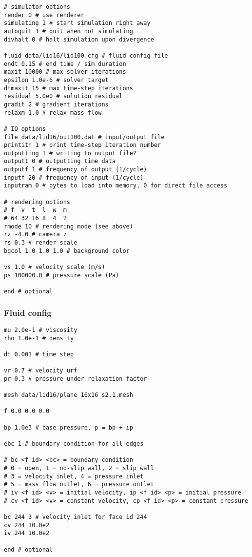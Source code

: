 \documentclass[12pt]{article}
\begin{document}
\begin{verbatim}
# simulator options
render 0 # use renderer
simulating 1 # start simulation right away
autoquit 1 # quit when not simulating
divhalt 0 # halt simulation upon divergence

fluid data/lid16/lid100.cfg # fluid config file
endt 0.15 # end time / sim duration
maxit 10000 # max solver iterations
epsilon 1.0e-6 # solver target
dtmaxit 15 # max time-step iterations
residual 5.0e0 # solution residual
gradit 2 # gradient iterations
relaxm 1.0 # relax mass flow

# IO options
file data/lid16/out100.dat # input/output file
printitn 1 # print time-step iteration number
outputting 1 # writing to output file?
outputt 0 # outputting time data
outputf 1 # frequency of output (1/cycle)
inputf 20 # frequency of input (1/cycle)
inputram 0 # bytes to load into memory, 0 for direct file access

# rendering options
# f  v  t  l  w  m
# 64 32 16 8  4  2
rmode 10 # rendering mode (see above)
rz -4.0 # camera z
rs 0.3 # render scale
bgcol 1.0 1.0 1.0 # background color

vs 1.0 # velocity scale (m/s)
ps 100000.0 # pressure scale (Pa)

end # optional
\end{verbatim}

\subsubsection{Fluid config}

\begin{verbatim}
mu 2.0e-1 # viscosity
rho 1.0e-1 # density

dt 0.001 # time step

vr 0.7 # velocity urf
pr 0.3 # pressure under-relaxation factor

mesh data/lid16/plane_16x16_s2.1.mesh

f 0.0 0.0 0.0

bp 1.0e3 # base pressure, p = bp + ip

ebc 1 # boundary condition for all edges

# bc <f id> <bc> = boundary condition
# 0 = open, 1 = no-slip wall, 2 = slip wall
# 3 = velocity inlet, 4 = pressure inlet
# 5 = mass flow outlet, 6 = pressure outlet
# iv <f id> <v> = initial velocity, ip <f id> <p> = initial pressure
# cv <f id> <v> = constant velocity, cp <f id> <p> = constant pressure

bc 244 3 # velocity inlet for face id 244
cv 244 10.0e2
iv 244 10.0e2

end # optional
\end{verbatim}
\end{document}
